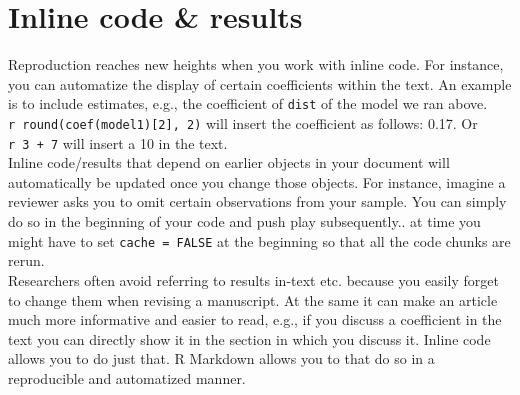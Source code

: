 \documentclass[
  12pt,
]{article}
\begin{document}
\begin{table}[H]

\caption{\label{tab:tab3}Table with kable() and kablestyling()}
\centering
{}
\end{table}

\hypertarget{inline-code-results}{%
\section{Inline code \& results}\label{inline-code-results}}

Reproduction reaches new heights when you work with inline code. For
instance, you can automatize the display of certain coefficients within
the text. An example is to include estimates, e.g., the coefficient of
\texttt{dist} of the model we ran above.
\texttt{\textasciigrave{}r\ round(coef(model1){[}2{]},\ 2)\textasciigrave{}}
will insert the coefficient as follows: 0.17. Or
\texttt{\textasciigrave{}r\ 3\ +\ 7\textasciigrave{}} will insert a 10
in the text.\\
Inline code/results that depend on earlier objects in your document will
automatically be updated once you change those objects. For instance,
imagine a reviewer asks you to omit certain observations from your
sample. You can simply do so in the beginning of your code and push play
subsequently.. at time you might have to set \texttt{cache\ =\ FALSE} at
the beginning so that all the code chunks are rerun.\\
Researchers often avoid referring to results in-text etc. because you
easily forget to change them when revising a manuscript. At the same it
can make an article much more informative and easier to read, e.g., if
you discuss a coefficient in the text you can directly show it in the
section in which you discuss it. Inline code allows you to do just that.
R Markdown allows you to that do so in a reproducible and automatized
manner.
\end{document}
